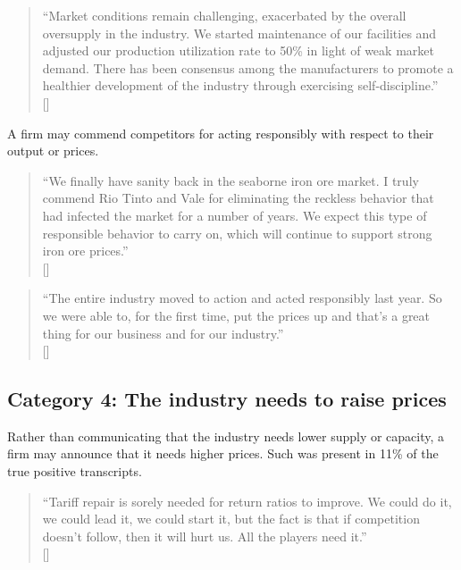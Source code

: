 \begin{quote}
``Market conditions remain challenging, exacerbated by the overall oversupply in the industry. We started maintenance of our facilities and adjusted our production utilization rate to 50\% in light of weak market demand. There has been consensus among the manufacturers to promote a healthier development of the industry through exercising self-discipline.'' \\
\mbox{[]}
\end{quote}


A firm may commend competitors for acting responsibly with respect to their output or prices.

\begin{quote}
``We finally have sanity back in the seaborne iron ore market. I truly commend Rio Tinto and Vale for eliminating the reckless behavior that had infected the market for a number of years. We expect this type of responsible behavior to carry on, which will continue to support strong iron ore prices.'' \\
\mbox{[]}
\end{quote}

\begin{quote}
``The entire industry moved to action and acted responsibly last year. So we were able to, for the first time, put the prices up and that's a great thing for our business and for our industry.'' \\
\mbox{[]}
\end{quote}



\subsection{Category 4: The industry needs to raise prices}
Rather than communicating that the industry needs lower supply or capacity, a firm may announce that it needs higher prices. Such was present in 11\% of the true positive transcripts.

\begin{quote}
``Tariff repair is sorely needed for return ratios to improve. We could do it, we could lead it, we could start it, but the fact is that if competition doesn't follow, then it will hurt us. All the players need it.'' \\
\mbox{[]}
\end{quote}


